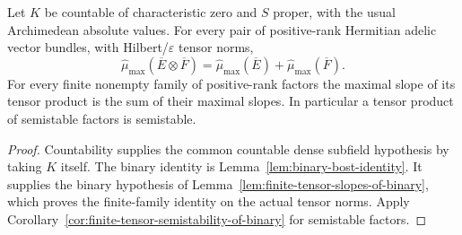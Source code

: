 \begin{theorem}
\label{thm:bost-adelic}
\leanok
Let $K$ be countable of characteristic zero and $S$ proper, with the
usual Archimedean absolute values. For every pair of positive-rank
Hermitian adelic vector bundles, with Hilbert/\(\varepsilon\) tensor norms,
\[
 \widehat\mu_{\max}(\overline E\otimes\overline F)=
 \widehat\mu_{\max}(\overline E)+\widehat\mu_{\max}(\overline F).
\]
For every finite nonempty family of positive-rank factors the maximal
slope of its tensor product is the sum of their maximal slopes. In
particular a tensor product of semistable factors is semistable.
\end{theorem}
\begin{proof}
Countability supplies the common countable dense subfield hypothesis
by taking $K$ itself. The binary identity is
Lemma~\ref{lem:binary-bost-identity}. It supplies the binary hypothesis of
Lemma~\ref{lem:finite-tensor-slopes-of-binary}, which proves the finite-family
identity on the actual tensor norms. Apply
Corollary~\ref{cor:finite-tensor-semistability-of-binary} for semistable factors.
\end{proof}

